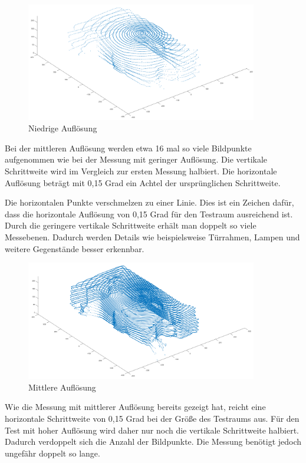 \begin{figure}[H]
	\centering
	\includegraphics[width=0.9\textwidth]{images/Validierung/Aufloesungen/niedrig.png}
	\caption{Niedrige Auflösung}
	\label{niedrig}
\end{figure}


Bei der mittleren Auflösung werden etwa 16 mal so viele Bildpunkte aufgenommen wie bei der Messung mit geringer Auflösung. Die vertikale Schrittweite wird im Vergleich zur ersten Messung halbiert. Die horizontale Auflösung beträgt mit 0,15 Grad ein Achtel der ursprünglichen Schrittweite. 

Die horizontalen Punkte verschmelzen zu einer Linie. Dies ist ein Zeichen dafür, dass die horizontale Auflösung von 0,15 Grad für den Testraum ausreichend ist. Durch die geringere vertikale Schrittweite erhält man doppelt so viele Messebenen. Dadurch werden Details wie beispielsweise Türrahmen, Lampen und weitere Gegenstände besser erkennbar. 


\begin{figure}[H]
	\centering
	\includegraphics[width=0.9\textwidth]{images/Validierung/Aufloesungen/mittel.png}
	\caption{Mittlere Auflösung}
	\label{mittel}
\end{figure}

Wie die Messung mit mittlerer Auflösung bereits gezeigt hat, reicht eine horizontale Schrittweite von 0,15 Grad bei der Größe des Testraums aus. Für den Test mit hoher Auflösung wird daher nur noch die vertikale Schrittweite halbiert. Dadurch verdoppelt sich die Anzahl der Bildpunkte. Die Messung benötigt jedoch ungefähr doppelt so lange.

